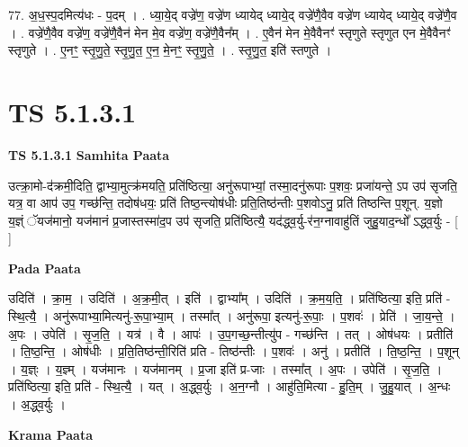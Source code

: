 \documentclass[17pt]{extarticle}
\begin{document}
77. अ॒ध॒स्प॒दमित्य॑धः - प॒दम् । . ध्या॒ये॒द् वज्रे॑ण॒ वज्रे॑ण ध्यायेद् ध्याये॒द् वज्रे॑णै॒वैव वज्रे॑ण ध्यायेद् ध्याये॒द् वज्रे॑णै॒व । . वज्रे॑णै॒वैव वज्रे॑ण॒ वज्रे॑णै॒वैन॑ मेन मे॒व वज्रे॑ण॒ वज्रे॑णै॒वैन᳚म् । . ए॒वैन॑ मेन मे॒वैवैनꣳ॑ स्तृणुते स्तृणुत एन मे॒वैवैनꣳ॑ स्तृणुते । . ए॒नꣳ॒॒ स्तृ॒णु॒ते॒ स्तृ॒णु॒त॒ ए॒न॒ मे॒नꣳ॒॒ स्तृ॒णु॒ते॒ । . स्तृ॒णु॒त॒ इति॑ स्तणुते । \newline
\pagebreak
{}

\section{ TS 5.1.3.1 }

\textbf{TS 5.1.3.1 } \newline
\textbf{Samhita Paata} \newline

उत्क्रा॒मो-द॑क्रमी॒दिति॒ द्वाभ्या॒मुत्क्र॑मयति॒ प्रति॑ष्ठित्या॒ अनु॑रूपाभ्यां॒ तस्मा॒दनु॑रूपाः प॒शवः॒ प्रजा॑यन्ते॒ ऽप उप॑ सृजति॒ यत्र॒ वा आप॑ उप॒ गच्छ॑न्ति॒ तदोष॑धयः॒ प्रति॑ तिष्ठ॒न्त्योष॑धीः प्रति॒तिष्ठ॑न्तीः प॒शवोऽनु॒ प्रति॑ तिष्ठन्ति प॒शून्. य॒ज्ञो य॒ज्ञ्ं ॅयज॑मानो॒ यज॑मानं प्र॒जास्तस्मा॑द॒प उप॑ सृजति॒ प्रति॑ष्ठित्यै॒ यद॑द्ध्व॒र्यु-र॑न॒ग्नावाहु॑तिं जुहु॒याद॒न्धो᳚ ऽद्ध्व॒र्युः - [  ] \newline

\textbf{Pada Paata} \newline

उदिति॑ । क्रा॒म॒ । उदिति॑ । अ॒क्र॒मी॒त् । इति॑ । द्वाभ्या᳚म् । उदिति॑ । क्र॒म॒य॒ति॒ । प्रति॑ष्ठित्या॒ इति॒ प्रति॑ - स्थि॒त्यै॒ । अनु॑रूपाभ्या॒मित्यनु॑-रू॒पा॒भ्या॒म् । तस्मा᳚त् । अनु॑रूपा॒ इत्यनु॑-रू॒पाः॒ । प॒शवः॑ । प्रेति॑ । जा॒य॒न्ते॒ । अ॒पः । उपेति॑ । सृ॒ज॒ति॒ । यत्र॑ । वै । आपः॑ । उ॒प॒गच्छ॒न्तीत्यु॑प - गच्छ॑न्ति । तत् । ओष॑धयः । प्रतीति॑ । ति॒ष्ठ॒न्ति॒ । ओष॑धीः । प्र॒ति॒तिष्ठ॑न्ती॒रिति॑ प्रति - तिष्ठ॑न्तीः । प॒शवः॑ । अनु॑ । प्रतीति॑ । ति॒ष्ठ॒न्ति॒ । प॒शून् । य॒ज्ञ्ः । य॒ज्ञ्म् । यज॑मानः । यज॑मानम् । प्र॒जा इति॑ प्र-जाः । तस्मा᳚त् । अ॒पः । उपेति॑ । सृ॒ज॒ति॒ । प्रति॑ष्ठित्या॒ इति॒ प्रति॑ - स्थि॒त्यै॒ । यत् । अ॒द्ध्व॒र्युः । अ॒न॒ग्नौ । आहु॑ति॒मित्या - हु॒ति॒म् । जु॒हु॒यात् । अ॒न्धः । अ॒द्ध्व॒र्युः ।  \newline


\textbf{Krama Paata} \newline
\end{document}
